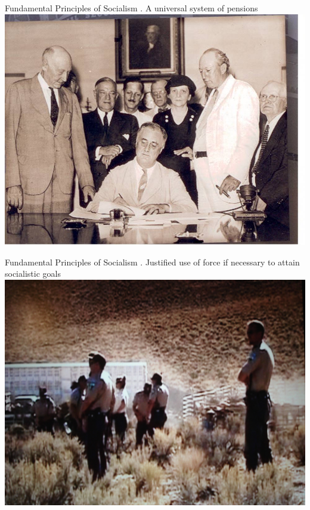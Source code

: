 \begin{frame}{Fundamental Principles of Socialism}
    . A universal system of pensions \\
    \includegraphics[width=.9\textwidth]{img/pensions.jpg} \\
\end{frame}

\begin{frame}{Fundamental Principles of Socialism}
    . Justified use of force if necessary to attain socialistic goals
    \includegraphics[width=.9\textwidth]{img/justified-force.jpg} \\
\end{frame}

